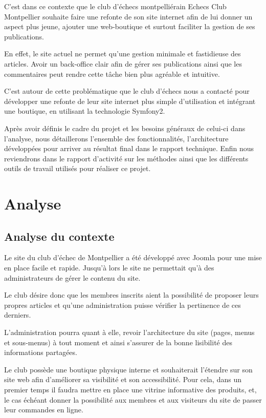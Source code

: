 \documentclass[a4paper,12pt, notitlepage]{report}
\begin{document}
C’est dans ce contexte que le club d’échecs montpelliérain Echecs Club Montpellier souhaite faire une refonte de son site internet afin de lui donner un aspect plus jeune, ajouter une web-boutique et surtout faciliter la gestion de ses publications.

En effet, le site actuel ne permet qu’une gestion minimale et fastidieuse des articles. Avoir un back-office clair afin de gérer ses publications ainsi que les commentaires peut rendre cette tâche bien plus agréable et intuitive.

C’est autour de cette problématique que le club d’échecs nous a contacté pour développer une refonte de leur site internet plus simple d’utilisation et intégrant une boutique, en utilisant la technologie Symfony2.

Après avoir définis le cadre du projet et les besoins généraux de celui-ci dans l’analyse, nous détaillerons l’ensemble des fonctionnalités, l’architecture développées pour arriver au résultat final dans le rapport technique. Enfin nous reviendrons dans le rapport d’activité sur les méthodes ainsi que les différents outils de travail utilisés pour réaliser ce projet.

\newpage








\part{Analyse} 

\chapter{Analyse du contexte}
Le site du club d’échec de Montpellier a été développé avec Joomla pour une mise en place facile et rapide.
Jusqu’à lors le site ne permettait qu’à des administrateurs de gérer le contenu du site.

Le club désire donc que les membres inscrits aient la possibilité de proposer leurs propres articles et qu’une administration puisse vérifier la pertinence de ces derniers.

L’administration pourra quant à elle, revoir l’architecture du site (pages, menus et sous-menus) à tout moment et ainsi s’assurer de la bonne lisibilité des informations partagées. 

Le club possède une boutique physique interne et souhaiterait l’étendre sur son site web afin d’améliorer sa visibilité et son accessibilité. Pour cela, dans un premier temps il faudra mettre en place une vitrine informative des produits, et, le cas échéant donner la possibilité aux membres et aux visiteurs du site de passer leur commandes en ligne.
\end{document}
